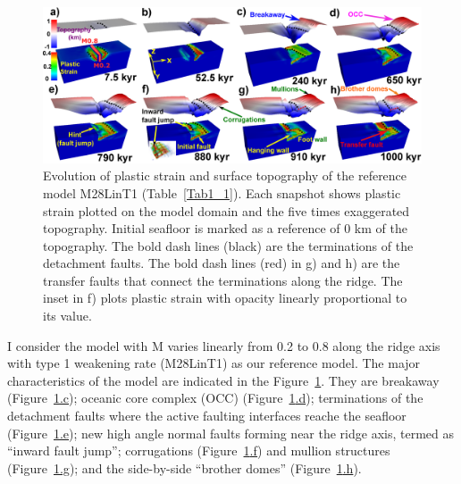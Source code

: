 \begin{figure}[h]
  \centering
    \includegraphics[width=1.0\textwidth]{./Figures/fig_Results_1_reference_model.eps}
  \caption{Evolution of plastic strain and surface topography of the reference model M28LinT1 (Table~\hyperref[Tab1_1]{\ref{Tab1_1}}). Each snapshot shows plastic strain plotted on the model domain and the five times exaggerated topography. Initial seafloor is marked as a reference of 0 km of the topography. The bold dash lines (black) are the terminations of the detachment faults. The bold dash lines (red) in g) and h) are the transfer faults that connect the terminations along the ridge. The inset in f) plots plastic strain with opacity linearly proportional to its value.}%
 \label{fig_Results1_1}
\end{figure}   

I consider the model with M varies linearly from 0.2 to 0.8 along the ridge axis with type 1 weakening rate (M28LinT1) as our reference model. The major characteristics of the model are indicated in the Figure~\hyperref[fig_Results1_1]{\ref{fig_Results1_1}}. They are breakaway (Figure~\hyperref[fig_Results1_1]{\ref{fig_Results1_1}.c}); oceanic core complex (OCC) (Figure~\hyperref[fig_Results1_1]{\ref{fig_Results1_1}.d}); terminations of the detachment faults where the active faulting interfaces reache the seafloor (Figure~\hyperref[fig_Results1_1]{\ref{fig_Results1_1}.e}); new high angle normal faults forming near the ridge axis, termed as ``inward fault jump''; corrugations (Figure~\hyperref[fig_Results1_1]{\ref{fig_Results1_1}.f}) and mullion structures (Figure~\hyperref[fig_Results1_1]{\ref{fig_Results1_1}.g}); and the side-by-side ``brother domes'' (Figure~\hyperref[fig_Results1_1]{\ref{fig_Results1_1}.h}).    

